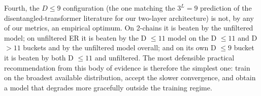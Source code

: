 \documentclass[11pt,a4paper]{article}
\begin{document}
Fourth, the \(D \le 9\) configuration (the one matching the \(3^L = 9\) prediction of the disentangled-transformer 
literature for our two-layer architecture) is not, by any of our metrics, an empirical optimum. On 2-chains it is 
beaten by the unfiltered model; on unfiltered ER it is beaten by the D \(\le 11\) model on the D \(\le 11\) and D
 \(> 11\) buckets and by the unfiltered model overall; and on its own D \(\le 9\) bucket it is beaten by both D 
 \(\le 11\) and unfiltered. The most defensible practical recommendation from this body of evidence is therefore 
 the simplest one: train on the broadest available distribution, accept the slower convergence, and obtain a model 
 that degrades more gracefully outside the training regime.
\end{document}
